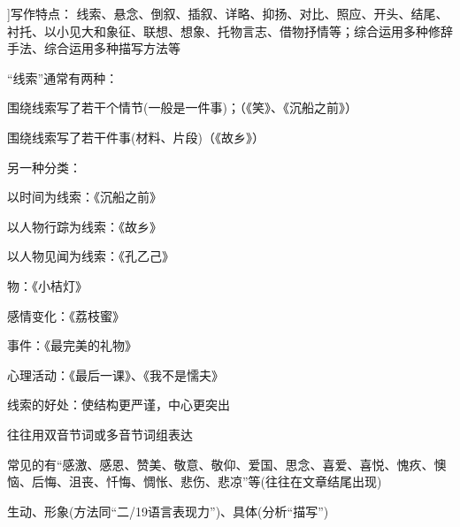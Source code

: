 \hatsubsection[\hatb[6]{2}{2011-06-14}]{写作特点：}
线索、悬念、倒叙、插叙、详略、抑扬、对比、照应、开头、结尾、衬托、以小见大和象征、联想、想象、托物言志、借物抒情等；综合运用多种修辞手法、综合运用多种描写方法等\par
``线索''通常有两种：\begin{asparaenum}[(1)]\item 围绕线索写了若干个情节(一般是一件事)；（《笑》、《沉船之前》）
                      \item 围绕线索写了若干件事(材料、片段)（《故乡》）\end{asparaenum}

另一种分类：\begin{asparaenum}[(1)]\item 以时间为线索：《沉船之前》
              \item 以人物行踪为线索：《故乡》
              \item 以人物见闻为线索：《孔乙己》
              \item 物：《小桔灯》
              \item 感情变化：《荔枝蜜》
              \item 事件：《最完美的礼物》
              \item 心理活动：《最后一课》、《我不是懦夫》\end{asparaenum}

线索的好处：使结构更严谨，中心更突出

  往往用双音节词或多音节词组表达

  常见的有``感激、感恩、赞美、敬意、敬仰、爱国、思念、喜爱、喜悦、愧疚、懊恼、后悔、沮丧、忏悔、惆怅、悲伤、悲凉''等(往往在文章结尾出现)

  生动、形象(方法同``二/19语言表现力'')、具体(分析``描写'')

